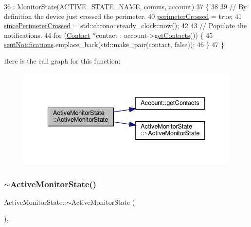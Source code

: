 \begin{DoxyCode}
36         : \hyperlink{class_monitor_state_ace027ab9e5703ac4e4b808eeebc3c961}{MonitorState}(\hyperlink{_active_monitor_state_8h_a9fdfa2faf1d746d8aa632437fd3bd03c}{ACTIVE\_STATE\_NAME}, comms, account)
37 \{
38 
39     \textcolor{comment}{// By definition the device just crossed the perimeter.}
40     \hyperlink{class_active_monitor_state_af4c93e1be350ea9cf4ac97f97abaf79e}{perimeterCrossed} = \textcolor{keyword}{true};
41     \hyperlink{class_active_monitor_state_a4313399b0922fccd66ecea2fcf77c08f}{sincePerimeterCrossed} = std::chrono::steady\_clock::now();
42 
43     \textcolor{comment}{// Populate the notifications.}
44     \textcolor{keywordflow}{for} (\hyperlink{class_contact}{Contact} *contact : account->\hyperlink{class_account_a53a9e366a589538552a368e3bbac2fd3}{getContacts}()) \{
45         \hyperlink{class_active_monitor_state_a25493a87079926faf7d03b8587ad9f62}{sentNotifications}.emplace\_back(std::make\_pair(contact, \textcolor{keyword}{false}));
46     \}
47 \}
\end{DoxyCode}
Here is the call graph for this function\+:\nopagebreak
\begin{figure}[H]
\begin{center}
\leavevmode
\includegraphics[width=334pt]{d9/db8/class_active_monitor_state_af1a0341307d63c900ccdc0a99fbe59e0_cgraph}
\end{center}
\end{figure}
\mbox{\label{class_active_monitor_state_accb86642ec52bae9aacd2aa4e9ff4410}} 
\subsubsection{\texorpdfstring{$\sim$\+Active\+Monitor\+State()}{~ActiveMonitorState()}}
{\footnotesize\ttfamily Active\+Monitor\+State\+::$\sim$\+Active\+Monitor\+State (\begin{DoxyParamCaption}{ }\end{DoxyParamCaption})\hspace{0.3cm}{\ttfamily [override]}, {\ttfamily [default]}}

